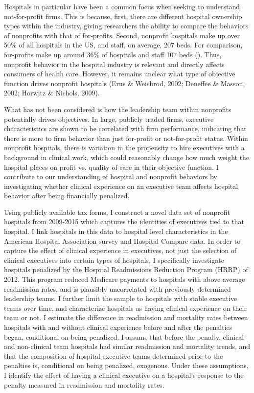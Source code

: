\documentclass[12pt]{article}
\begin{document}
  Hospitals in particular have been a common focus when seeking to understand not-for-profit firms. This is because, first, there are different hospital ownership types within the industry, giving researchers the ability to compare the behaviors of nonprofits with that of for-profits. Second, nonprofit hospitals make up over 50\% of all hospitals in the US, and staff, on average, 207 beds. For comparison, for-profits make up around 36\% of hospitals and staff 107 beds (\cite{ASPE_2023}). Thus, nonprofit behavior in the hospital industry is relevant and directly affects consumers of health care. However, it remains unclear what type of objective function drives nonprofit hospitals (Erus \& Weisbrod, 2002; Deneffee \& Masson, 2002; Horwitz \& Nichols, 2009). 
  
  What has not been considered is how the leadership team within nonprofits potentially drives objectives. In large, publicly traded firms, executive characteristics are shown to be correlated with firm performance, indicating that there is more to firm behavior than just for-profit or not-for-profit status. Within nonprofit hospitals, there is variation in the propensity to hire executives with a background in clinical work, which could reasonably change how much weight the hospital places on profit vs. quality of care in their objective function. I contribute to our understanding of hospital and nonprofit behaviors by investigating whether clinical experience on an executive team affects hospital behavior after being financially penalized.

  Using publicly available tax forms, I construct a novel data set of nonprofit hospitals from 2009-2015 which captures the identities of executives tied to that hospital. I link hospitals in this data to hospital level characteristics in the American Hospital Association survey and Hospital Compare data. In order to capture the effect of clinical experience in executives, not just the selection of clinical executives into certain types of hospitals, I specifically investigate hospitals penalized by the Hospital Readmissions Reduction Program (HRRP) of 2012. This program reduced Medicare payments to hospitals with above average readmission rates, and is plausibly uncorrelated with previously determined leadership teams. I further limit the sample to hospitals with stable executive teams over time, and characterize hospitals as having clinical experience on their team or not. I estimate the difference in readmission and mortality rates between hospitals with and without clinical experience before and after the penalties began, conditional on being penalized. I assume that before the penalty, clinical and non-clinical team hospitals had similar readmission and mortality trends, and that the composition of hospital executive teams determined prior to the penalties is, conditional on being penalized, exogenous. Under these assumptions, I identify the effect of having a clinical executive on a hospital’s response to the penalty measured in readmission and mortality rates. 
\end{document}
